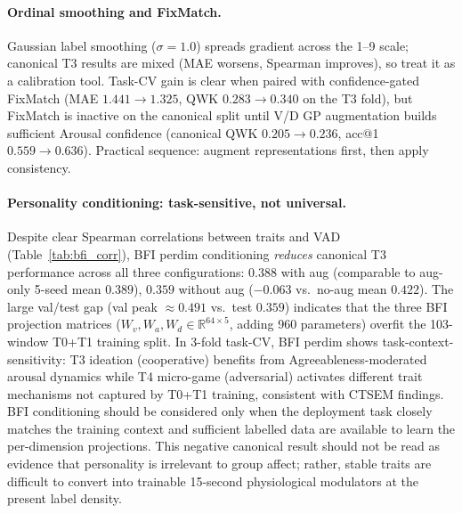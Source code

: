 \documentclass[sigconf,nonacm]{acmart}
\begin{document}
\paragraph{Ordinal smoothing and FixMatch.}
Gaussian label smoothing ($\sigma{=}1.0$) spreads gradient across the 1--9
scale; canonical T3 results are mixed (MAE worsens, Spearman improves),
so treat it as a calibration tool.
Task-CV gain is clear when paired with confidence-gated FixMatch
(MAE $1.441\to1.325$, QWK $0.283\to0.340$ on the T3 fold), but FixMatch
is inactive on the canonical split until V/D GP augmentation builds sufficient
Arousal confidence (canonical QWK $0.205\to0.236$, acc@1 $0.559\to0.636$).
Practical sequence: augment representations first, then apply consistency.

\paragraph{Personality conditioning: task-sensitive, not universal.}
Despite clear Spearman correlations between traits and VAD
(Table~\ref{tab:bfi_corr}), BFI perdim conditioning \emph{reduces}
canonical T3 performance across all three configurations:
$0.388$ with aug (comparable to aug-only 5-seed mean $0.389$), $0.359$
without aug ($-0.063$ vs.\ no-aug mean $0.422$).
The large val/test gap (val peak $\approx 0.491$ vs.\ test $0.359$)
indicates that the three BFI projection matrices
($W_v, W_a, W_d \in \mathbb{R}^{64 \times 5}$, adding 960 parameters)
overfit the 103-window T0+T1 training split.
In 3-fold task-CV, BFI perdim shows task-context-sensitivity:
T3 ideation (cooperative) benefits from Agreeableness-moderated arousal
dynamics while T4 micro-game (adversarial) activates different trait
mechanisms not captured by T0+T1 training, consistent with CTSEM findings.
BFI conditioning should be considered only when the deployment task closely
matches the training context and sufficient labelled data are available to
learn the per-dimension projections.
This negative canonical result should not be read as evidence that
personality is irrelevant to group affect; rather, stable traits are difficult
to convert into trainable 15-second physiological modulators at the present
label density.
\end{document}
